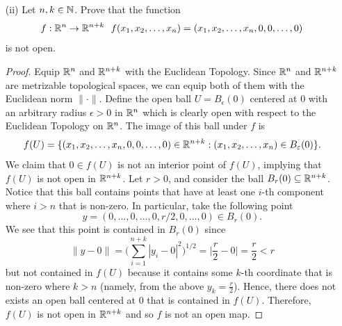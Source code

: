 \documentclass[a4paper]{article}
\begin{document}
\begin{problem}
\begin{enumerate}
\begin{enumerate}
\begin{proof}
                        \( (\Longleftarrow) \) Suppose that \( i  \) is closed. That is, for all closed sets \( V \) in \( A  \), \( i(V) \) is closed in \( X  \). Since \( A  \) itself is closed in its subspace topology, it follows that \( i(A) \) is closed in \( X  \). But by definition \( i(A) = A  \) and so \( A  \) is closed in \( X  \).

                    \end{proof}
           \end{enumerate}
       \item[(ii)] Let \( n,k \in \mathbb{N}  \). Prove that the function
           \[  f: \R^{n} \to \R^{n+k} \ \ f({x}_{1}, {x}_{2}, \dots, {x}_{n}) = ({x}_{1}, {x}_{2}, \dots, {x}_{n}, 0 , 0 , \dots, 0) \]
           is not open.
           \begin{proof}
               Equip \( \mathbb{R}^{n} \) and \( \mathbb{R}^{n+k} \) with the Euclidean Topology. Since \( \mathbb{R}^{n}  \) and \( \mathbb{R}^{n+k} \) are metrizable topological spaces, we can equip both of them with the Euclidean norm \( \|\cdot\| \). Define the open ball \( U = {B}_{\epsilon}(0) \) centered at \( 0  \) with an arbitrary radius \( \epsilon > 0   \) in \( \mathbb{R}^{n} \) which is clearly open with respect to the Euclidean Topology on \( \mathbb{R}^{n} \). The image of this ball under \( f  \) is \[  f(U) = \{ ({x}_{1}, {x}_{2}, \dots, {x}_{n}, 0, 0, \dots , 0 ) \in \mathbb{R}^{n+k} : ({x}_{1}, {x}_{2}, \dots, {x}_{n}) \in {B}_{\varepsilon}(0) \}. \] 
              We claim that \( 0 \in f(U) \) is not an interior point of \( f(U) \), implying that \( f(U)  \) is not open in \( \mathbb{R}^{n+k} \). Let \( r > 0  \), and consider the ball \( {B}_{r}(0) \subseteq \mathbb{R}^{n+k} \). Notice that this ball contains points that have at least one \( i \)-th component where \( i > n  \) that is non-zero. In particular, take the following point  
               \[  y = (0, \dots, 0, \dots, 0, r/2, 0, \dots, 0) \in {B}_{r}(0). \]
            We see that this point is contained in \( {B}_{r}(0) \) since  
            \[  \| y - 0  \| = \Big( \sum_{ i=1  }^{ n + k } | {y}_{i} - 0 |^{2}  \Big)^{1/2} = \Big| \frac{ r }{ 2 }  -  0  \Big| = \frac{ r }{ 2 }  < r   \]
            but not contained in \( f(U) \) because it contains some \( k  \)-th coordinate that is non-zero where \( k > n  \) (namely, from the above \( {y}_{k} = \frac{ r }{ 2 }  \)).      
               Hence, there does not exists an open ball centered at \(  0 \) that is contained in \( f(U) \). Therefore, \( f(U) \) is not open in \( \mathbb{R}^{n+k} \) and so \( f \) is not an open map. 
    \end{proof}
   \end{enumerate} 
\end{problem}
\end{document}
